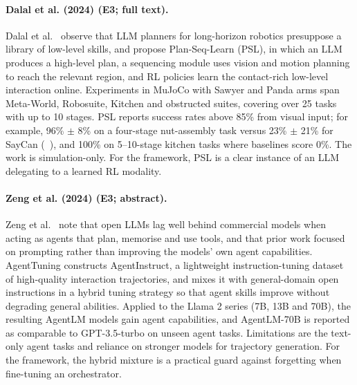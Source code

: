 \documentclass[10pt,a4paper]{article}
\begin{document}
\paragraph{Dalal et al. (2024) (E3; full text).} Dalal et al.~\cite{Dalal2024} observe that LLM planners for long-horizon robotics presuppose a library of low-level skills, and propose Plan-Seq-Learn (PSL), in which an LLM produces a high-level plan, a sequencing module uses vision and motion planning to reach the relevant region, and RL policies learn the contact-rich low-level interaction online. Experiments in MuJoCo with Sawyer and Panda arms span Meta-World, Robosuite, Kitchen and obstructed suites, covering over 25 tasks with up to 10 stages. PSL reports success rates above 85\% from visual input; for example, 96\% $\pm$ 8\% on a four-stage nut-assembly task versus 23\% $\pm$ 21\% for SayCan (~\cite{Ahn2022}), and 100\% on 5--10-stage kitchen tasks where baselines score 0\%. The work is simulation-only. For the framework, PSL is a clear instance of an LLM delegating to a learned RL modality.

\paragraph{Zeng et al. (2024) (E3; abstract).} Zeng et al.~\cite{Zeng2024} note that open LLMs lag well behind commercial models when acting as agents that plan, memorise and use tools, and that prior work focused on prompting rather than improving the models' own agent capabilities. AgentTuning constructs AgentInstruct, a lightweight instruction-tuning dataset of high-quality interaction trajectories, and mixes it with general-domain open instructions in a hybrid tuning strategy so that agent skills improve without degrading general abilities. Applied to the Llama 2 series (7B, 13B and 70B), the resulting AgentLM models gain agent capabilities, and AgentLM-70B is reported as comparable to GPT-3.5-turbo on unseen agent tasks. Limitations are the text-only agent tasks and reliance on stronger models for trajectory generation. For the framework, the hybrid mixture is a practical guard against forgetting when fine-tuning an orchestrator.
\end{document}
